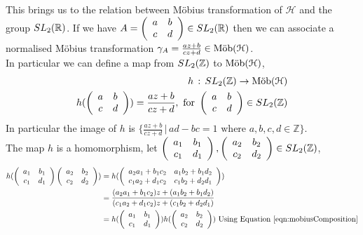 This brings us to the relation between Möbius transformation of $\mathcal{H}$ and the group $ SL_2(\mathbb{R})$.
If we have $A = \left(\begin{array}{ c c } a & b \\ c & d \end{array} \right) \in SL_2(\mathbb{R})$ then we can associate a normalised Möbius transformation $\gamma_A = \frac{az + b}{cz +d} \in \text{M{\"o}b}(\mathcal{H})$. \\
In particular we can define a map from $SL_2(\mathbb{Z})$ to $\text{M{\"o}b}(\mathcal{H})$,
\begin{align*}
h \, : \, SL_2(\mathbb{Z}) \rightarrow \text{M{\"o}b}(\mathcal{H}) \\
h(\left(\begin{array}{ c c } a & b \\ c & d \end{array} \right)) = \frac{az + b}{cz +d}, \text{ for } \left(\begin{array}{ c c } a & b \\ c & d \end{array} \right) \in SL_2(\mathbb{Z})
\end{align*}
In particular the image of $h$ is $ \{ \frac{az + b}{cz +d} \, \vert \, ad -bc =1 \text{ where } a,b,c,d \in \mathbb{Z}\}$.\\
The map $h$ is a homomorphism, let $ \left(\begin{array}{ c c } a_1 & b_1 \\ c_1 & d_1 \end{array} \right), \left(\begin{array}{ c c } a_2 & b_2 \\ c_2 & d_2 \end{array} \right) \in SL_2(\mathbb{Z})$,
\begin{align*}
h( \left(\begin{array}{ c c } a_1 & b_1 \\ c_1 & d_1 \end{array} \right) \left(\begin{array}{ c c } a_2 & b_2 \\ c_2 & d_2 \end{array} \right) ) &=  h ( \left( \begin{array}{ c c } a_2a_1 + b_1c_2 & a_1b_2 + b_1d_2 \\ c_1a_2 + d_1c_2 & c_1b_2 + d_2d_1 \end{array} \right) ) \\
 &= \frac{(a_2a_1 + b_1c_2)z + (a_1b_2 + b_1d_2) }{(c_1a_2 + d_1c_2)z + (c_1b_2 + d_2d_1)} \\
 & = h( \left(\begin{array}{ c c } a_1 & b_1 \\ c_1 & d_1 \end{array} \right)) h(\left(\begin{array}{ c c } a_2 & b_2 \\ c_2 & d_2 \end{array} \right) )  \text{ Using Equation \ref{eqn:mobiusComposition}} \\
\end{align*} 

